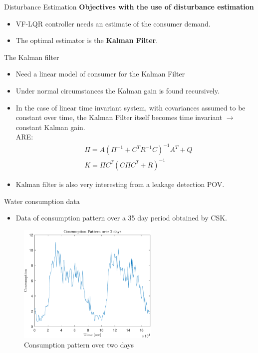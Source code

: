 \begin{frame}{Disturbance Estimation}
	 \textbf{Objectives with the use of disturbance estimation}
	 \begin{itemize}
	 	\item VF-LQR controller needs an estimate of the consumer demand.
	 	\item The optimal estimator is the \textbf{Kalman Filter}.
	 \end{itemize}
\end{frame}


\begin{frame}{The Kalman filter}
 	\begin{itemize}
 		\item Need a linear model of consumer for the Kalman Filter
 		\item Under normal circumstances the Kalman gain is found recursively.
 		\item In the case of linear time invariant system, with covariances assumed to be constant over time, the Kalman Filter itself becomes time invariant $\rightarrow$ constant Kalman gain.\\
 		ARE:
 		\begin{equation}
 			\begin{split}\label{eq:ss_kalman_udledning4}
 				&\Pi = {A} (\Pi^{-1} + {C}^T {R}^{-1} {C})^{-1} {A}^T + {Q}\\
 				& K = \Pi {C}^T ({C} \Pi {C}^T + {R})^{-1}
 			\end{split}
 		\end{equation}
 		\item Kalman filter is also very interesting from a leakage detection POV.
 	\end{itemize}
\end{frame}


\begin{frame}{Water consumption data}
	\begin{itemize}
		\item Data of consumption pattern over a 35 day period obtained by CSK.  
	\end{itemize}
		 \begin{figure}[h!]
			\centering
			\includegraphics[width=0.6\textwidth]{Topics/KalmanEstimator/Graphics/ConsumptionPattern.pdf}
			\caption{Consumption pattern over two days}
			\label{fig:Consumption_Pattern}
		\end{figure}
\end{frame}

